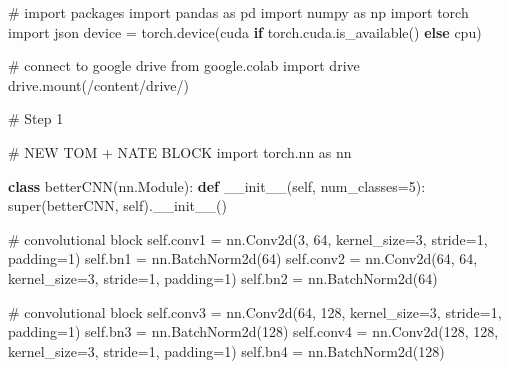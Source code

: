 \documentclass[
  letterpaper,
  DIV=11,
  numbers=noendperiod]{scrartcl}
\newenvironment{Shaded}{\begin{snugshade}}{\end{snugshade}}
\newcommand{\BuiltInTok}[1]{\textcolor[rgb]{0.00,0.23,0.31}{#1}}
\newcommand{\CommentTok}[1]{\textcolor[rgb]{0.37,0.37,0.37}{#1}}
\newcommand{\ControlFlowTok}[1]{\textcolor[rgb]{0.00,0.23,0.31}{\textbf{#1}}}
\newcommand{\DecValTok}[1]{\textcolor[rgb]{0.68,0.00,0.00}{#1}}
\newcommand{\FunctionTok}[1]{\textcolor[rgb]{0.28,0.35,0.67}{#1}}
\newcommand{\ImportTok}[1]{\textcolor[rgb]{0.00,0.46,0.62}{#1}}
\newcommand{\KeywordTok}[1]{\textcolor[rgb]{0.00,0.23,0.31}{\textbf{#1}}}
\newcommand{\NormalTok}[1]{\textcolor[rgb]{0.00,0.23,0.31}{#1}}
\newcommand{\OperatorTok}[1]{\textcolor[rgb]{0.37,0.37,0.37}{#1}}
\newcommand{\StringTok}[1]{\textcolor[rgb]{0.13,0.47,0.30}{#1}}
\newcommand{\VariableTok}[1]{\textcolor[rgb]{0.07,0.07,0.07}{#1}}
\begin{document}
\begin{Shaded}
\begin{Highlighting}[]

\CommentTok{\# import packages}
\ImportTok{import}\NormalTok{ pandas }\ImportTok{as}\NormalTok{ pd}
\ImportTok{import}\NormalTok{ numpy }\ImportTok{as}\NormalTok{ np}
\ImportTok{import}\NormalTok{ torch}
\ImportTok{import}\NormalTok{ json}
\NormalTok{device }\OperatorTok{=}\NormalTok{ torch.device(}\StringTok{\textquotesingle{}cuda\textquotesingle{}} \ControlFlowTok{if}\NormalTok{ torch.cuda.is\_available() }\ControlFlowTok{else} \StringTok{\textquotesingle{}cpu\textquotesingle{}}\NormalTok{)}


\CommentTok{\# connect to google drive}
\ImportTok{from}\NormalTok{ google.colab }\ImportTok{import}\NormalTok{ drive}
\NormalTok{drive.mount(}\StringTok{\textquotesingle{}/content/drive/\textquotesingle{}}\NormalTok{)}

\CommentTok{\# Step 1}

\CommentTok{\# NEW TOM + NATE BLOCK}
\ImportTok{import}\NormalTok{ torch.nn }\ImportTok{as}\NormalTok{ nn}

\KeywordTok{class}\NormalTok{ betterCNN(nn.Module):}
    \KeywordTok{def} \FunctionTok{\_\_init\_\_}\NormalTok{(}\VariableTok{self}\NormalTok{, num\_classes}\OperatorTok{=}\DecValTok{5}\NormalTok{):}
        \BuiltInTok{super}\NormalTok{(betterCNN, }\VariableTok{self}\NormalTok{).}\FunctionTok{\_\_init\_\_}\NormalTok{()}

        \CommentTok{\# convolutional block}
        \VariableTok{self}\NormalTok{.conv1 }\OperatorTok{=}\NormalTok{ nn.Conv2d(}\DecValTok{3}\NormalTok{, }\DecValTok{64}\NormalTok{, kernel\_size}\OperatorTok{=}\DecValTok{3}\NormalTok{, stride}\OperatorTok{=}\DecValTok{1}\NormalTok{, padding}\OperatorTok{=}\DecValTok{1}\NormalTok{)}
        \VariableTok{self}\NormalTok{.bn1 }\OperatorTok{=}\NormalTok{ nn.BatchNorm2d(}\DecValTok{64}\NormalTok{)}
        \VariableTok{self}\NormalTok{.conv2 }\OperatorTok{=}\NormalTok{ nn.Conv2d(}\DecValTok{64}\NormalTok{, }\DecValTok{64}\NormalTok{, kernel\_size}\OperatorTok{=}\DecValTok{3}\NormalTok{, stride}\OperatorTok{=}\DecValTok{1}\NormalTok{, padding}\OperatorTok{=}\DecValTok{1}\NormalTok{)}
        \VariableTok{self}\NormalTok{.bn2 }\OperatorTok{=}\NormalTok{ nn.BatchNorm2d(}\DecValTok{64}\NormalTok{)}

        \CommentTok{\# convolutional block}
        \VariableTok{self}\NormalTok{.conv3 }\OperatorTok{=}\NormalTok{ nn.Conv2d(}\DecValTok{64}\NormalTok{, }\DecValTok{128}\NormalTok{, kernel\_size}\OperatorTok{=}\DecValTok{3}\NormalTok{, stride}\OperatorTok{=}\DecValTok{1}\NormalTok{, padding}\OperatorTok{=}\DecValTok{1}\NormalTok{)}
        \VariableTok{self}\NormalTok{.bn3 }\OperatorTok{=}\NormalTok{ nn.BatchNorm2d(}\DecValTok{128}\NormalTok{)}
        \VariableTok{self}\NormalTok{.conv4 }\OperatorTok{=}\NormalTok{ nn.Conv2d(}\DecValTok{128}\NormalTok{, }\DecValTok{128}\NormalTok{, kernel\_size}\OperatorTok{=}\DecValTok{3}\NormalTok{, stride}\OperatorTok{=}\DecValTok{1}\NormalTok{, padding}\OperatorTok{=}\DecValTok{1}\NormalTok{)}
        \VariableTok{self}\NormalTok{.bn4 }\OperatorTok{=}\NormalTok{ nn.BatchNorm2d(}\DecValTok{128}\NormalTok{)}


\end{Highlighting}
\end{Shaded}
\end{document}
